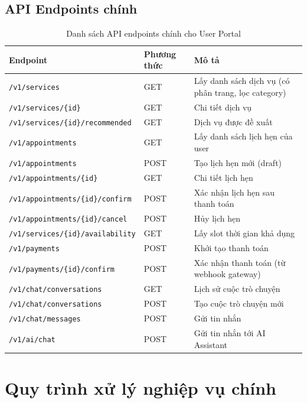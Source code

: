 \subsection{API Endpoints chính}

\begin{table}[H]
\centering
\begin{tabularx}{\linewidth}{|l|X|X|}
\hline
\textbf{Endpoint} & \textbf{Phương thức} & \textbf{Mô tả} \\
\hline
\texttt{/v1/services} & GET & Lấy danh sách dịch vụ (có phân trang, lọc category) \\
\hline
\texttt{/v1/services/\{id\}} & GET & Chi tiết dịch vụ \\
\hline
\texttt{/v1/services/\{id\}/recommended} & GET & Dịch vụ được đề xuất \\
\hline
\texttt{/v1/appointments} & GET & Lấy danh sách lịch hẹn của user \\
\hline
\texttt{/v1/appointments} & POST & Tạo lịch hẹn mới (draft) \\
\hline
\texttt{/v1/appointments/\{id\}} & GET & Chi tiết lịch hẹn \\
\hline
\texttt{/v1/appointments/\{id\}/confirm} & POST & Xác nhận lịch hẹn sau thanh toán \\
\hline
\texttt{/v1/appointments/\{id\}/cancel} & POST & Hủy lịch hẹn \\
\hline
\texttt{/v1/services/\{id\}/availability} & GET & Lấy slot thời gian khả dụng \\
\hline
\texttt{/v1/payments} & POST & Khởi tạo thanh toán \\
\hline
\texttt{/v1/payments/\{id\}/confirm} & POST & Xác nhận thanh toán (từ webhook gateway) \\
\hline
\texttt{/v1/chat/conversations} & GET & Lịch sử cuộc trò chuyện \\
\hline
\texttt{/v1/chat/conversations} & POST & Tạo cuộc trò chuyện mới \\
\hline
\texttt{/v1/chat/messages} & POST & Gửi tin nhắn \\
\hline
\texttt{/v1/ai/chat} & POST & Gửi tin nhắn tới AI Assistant \\
\hline
\end{tabularx}
\caption{Danh sách API endpoints chính cho User Portal}
\label{tab:user_api_endpoints}
\end{table}

\section{Quy trình xử lý nghiệp vụ chính}

